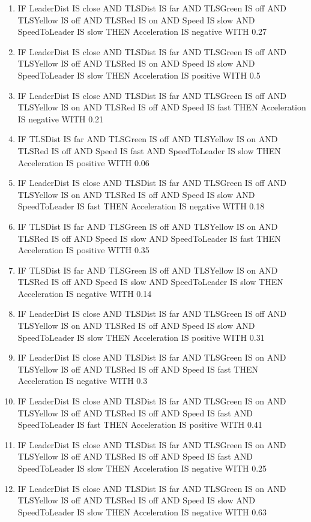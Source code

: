 \begin{enumerate}
	\item IF LeaderDist IS close AND TLSDist IS far AND TLSGreen IS off AND TLSYellow IS off AND TLSRed IS on AND Speed IS slow AND SpeedToLeader IS slow THEN Acceleration IS negative WITH 0.27
	\item IF LeaderDist IS close AND TLSDist IS far AND TLSGreen IS off AND TLSYellow IS off AND TLSRed IS on AND Speed IS slow AND SpeedToLeader IS slow THEN Acceleration IS positive WITH 0.5
	\item IF LeaderDist IS close AND TLSDist IS far AND TLSGreen IS off AND TLSYellow IS on AND TLSRed IS off AND Speed IS fast THEN Acceleration IS negative WITH 0.21
	\item IF TLSDist IS far AND TLSGreen IS off AND TLSYellow IS on AND TLSRed IS off AND Speed IS fast AND SpeedToLeader IS slow THEN Acceleration IS positive WITH 0.06
	\item IF LeaderDist IS close AND TLSDist IS far AND TLSGreen IS off AND TLSYellow IS on AND TLSRed IS off AND Speed IS slow AND SpeedToLeader IS fast THEN Acceleration IS negative WITH 0.18
	\item IF TLSDist IS far AND TLSGreen IS off AND TLSYellow IS on AND TLSRed IS off AND Speed IS slow AND SpeedToLeader IS fast THEN Acceleration IS positive WITH 0.35
	\item IF TLSDist IS far AND TLSGreen IS off AND TLSYellow IS on AND TLSRed IS off AND Speed IS slow AND SpeedToLeader IS slow THEN Acceleration IS negative WITH 0.14
	\item IF LeaderDist IS close AND TLSDist IS far AND TLSGreen IS off AND TLSYellow IS on AND TLSRed IS off AND Speed IS slow AND SpeedToLeader IS slow THEN Acceleration IS positive WITH 0.31
	\item IF LeaderDist IS close AND TLSDist IS far AND TLSGreen IS on AND TLSYellow IS off AND TLSRed IS off AND Speed IS fast THEN Acceleration IS negative WITH 0.3
	\item IF LeaderDist IS close AND TLSDist IS far AND TLSGreen IS on AND TLSYellow IS off AND TLSRed IS off AND Speed IS fast AND SpeedToLeader IS fast THEN Acceleration IS positive WITH 0.41
	\item IF LeaderDist IS close AND TLSDist IS far AND TLSGreen IS on AND TLSYellow IS off AND TLSRed IS off AND Speed IS fast AND SpeedToLeader IS slow THEN Acceleration IS negative WITH 0.25
	\item IF LeaderDist IS close AND TLSDist IS far AND TLSGreen IS on AND TLSYellow IS off AND TLSRed IS off AND Speed IS slow AND SpeedToLeader IS slow THEN Acceleration IS negative WITH 0.63

\end{enumerate}
